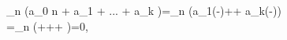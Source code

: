 \lim_{n \to \infty } (a_0 \sqrt n  + a_1   + ... + a_k  )=\lim_{n \to \infty } (a_1(-)+\cdots + a_k(-))\\=\lim_{n \to \infty } \left(++\cdots + \right)=0,